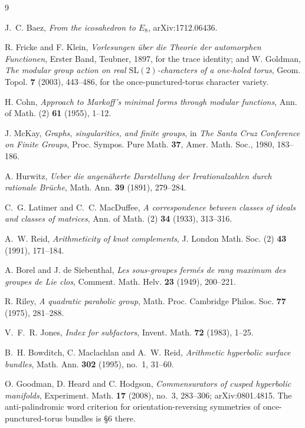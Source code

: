 \documentclass[11pt,reqno]{amsart}
\theoremstyle{plain}
\theoremstyle{definition}
\theoremstyle{remark}
\newcommand{\SL}{\mathrm{SL}}
\begin{document}
\begin{thebibliography}{9}

 J.~C. Baez, \emph{From the icosahedron to $E_8$}, arXiv:1712.06436.

 R. Fricke and F. Klein, \emph{Vorlesungen \"uber die Theorie der
automorphen Functionen}, Erster Band, Teubner, 1897, for the trace identity; and
W. Goldman, \emph{The modular group action on real $\SL(2)$-characters of a one-holed
torus}, Geom. Topol. \textbf{7} (2003), 443--486, for the once-punctured-torus character
variety.

 H. Cohn, \emph{Approach to Markoff's minimal forms through modular
  functions}, Ann. of Math. (2) \textbf{61} (1955), 1--12.

 J. McKay, \emph{Graphs, singularities, and finite groups}, in
  \emph{The Santa Cruz Conference on Finite Groups}, Proc. Sympos. Pure Math.
  \textbf{37}, Amer. Math. Soc., 1980, 183--186.

 A. Hurwitz, \emph{Ueber die angen\"aherte Darstellung der
  Irrationalzahlen durch rationale Br\"uche}, Math. Ann. \textbf{39} (1891), 279--284.

 C.~G. Latimer and C.~C. MacDuffee, \emph{A correspondence
  between classes of ideals and classes of matrices}, Ann. of Math. (2) \textbf{34}
  (1933), 313--316.

 A.~W. Reid, \emph{Arithmeticity of knot complements},
  J. London Math. Soc. (2) \textbf{43} (1991), 171--184.

 A. Borel and J. de Siebenthal, \emph{Les sous-groupes ferm\'es de rang
  maximum des groupes de Lie clos}, Comment. Math. Helv. \textbf{23} (1949), 200--221.

 R. Riley, \emph{A quadratic parabolic group}, Math. Proc. Cambridge
  Philos. Soc. \textbf{77} (1975), 281--288.

 V.~F.~R. Jones, \emph{Index for subfactors}, Invent. Math. \textbf{72}
(1983), 1--25.

 B.~H. Bowditch, C. Maclachlan and A.~W. Reid, \emph{Arithmetic
  hyperbolic surface bundles}, Math. Ann. \textbf{302} (1995), no.~1, 31--60.

 O. Goodman, D. Heard and C. Hodgson, \emph{Commensurators of cusped
  hyperbolic manifolds}, Experiment. Math. \textbf{17} (2008), no.~3, 283--306;
  arXiv:0801.4815. The anti-palindromic word criterion for orientation-reversing
  symmetries of once-punctured-torus bundles is \S6 there.


\end{thebibliography}
\end{document}

